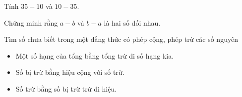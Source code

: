 \begin{vd}%
	\begin{enumEX}{1}
			\item Tính $35-10$ và $10-35$.
		\item Chứng minh rằng $a-b$ và $b -a$ là hai số đối nhau.
	\end{enumEX}

\end{vd}
\begin{dang}{Tìm số chưa biết trong một đẳng thức có phép cộng, phép trừ các số nguyên}
\begin{itemize}
	\item Một số hạng của tổng bằng tổng trừ đi số hạng kia.
	\item Số bị trừ bằng hiệu cộng với số trừ.
	\item Số trừ bằng số bị trừ trừ đi hiệu.
\end{itemize}
\end{dang}
